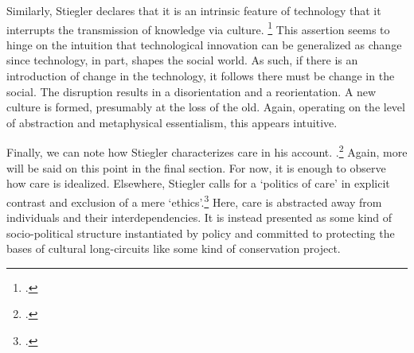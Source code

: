 \documentclass[letterpaper,notitlepage,12pt]{article}
\begin{document}
Similarly, Stiegler declares that it is an intrinsic feature of technology that
it interrupts the transmission of knowledge via culture. \footcite[ch. 2.8]{stiegler_age_2019}
This assertion seems to hinge on the intuition that technological innovation can
be generalized  as change since technology, in part, shapes the social world.
As such, if there is an introduction of change in the technology, it follows
there must be change in the social.
The disruption results in a disorientation and a reorientation.
A new culture is formed, presumably at the loss of the old.
Again, operating on the level of abstraction and metaphysical essentialism, this
appears intuitive.

Finally, we can note how Stiegler characterizes care in his account.
.\footcite[p. 32]{stiegler_what_2013}
Again, more will be said on this point in the final section.
For now, it is enough to observe how care is idealized.
Elsewhere, Stiegler calls for a `politics of care' in explicit contrast and
exclusion of a mere `ethics'.\footcite[p. 97]{stiegler_what_2013}
Here, care is abstracted away from individuals and their interdependencies.
It is instead presented as some kind of socio-political structure instantiated
by policy and committed to protecting the bases of cultural long-circuits like
some kind of conservation project.
\end{document}
